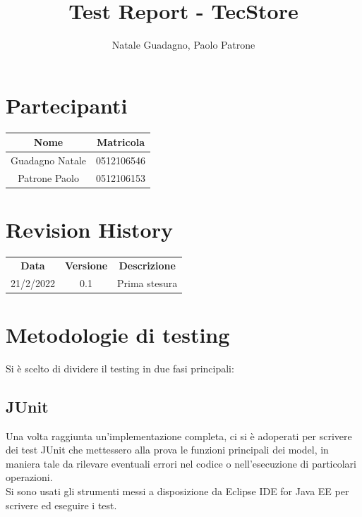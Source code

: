 \documentclass[12pt]{article}
\author{Natale Guadagno, Paolo Patrone}
\title{Test Report - TecStore}
\begin{document}
\maketitle
\newpage
\tableofcontents
\newpage
{}
\section*{Partecipanti}
\begin{center}
\begin{tabular} {|c|c|}
\hline
\textbf{Nome} & \textbf{Matricola} \\
\hline
Guadagno Natale & 0512106546 \\
Patrone Paolo & 0512106153 \\
\hline
\end{tabular}
\end{center}


\section*{Revision History}
\begin{center}
\begin{tabular} {|c|c|c|}
\hline
\textbf{Data} & \textbf{Versione} & \textbf{Descrizione} \\
21/2/2022 & 0.1 & Prima stesura \\
\hline

\hline
\end{tabular}
\end{center}

\newpage

\section{Metodologie di testing}
Si è scelto di dividere il testing in due fasi principali:
\subsection{JUnit}
Una volta raggiunta un'implementazione completa, ci si è adoperati per scrivere dei test JUnit che mettessero alla prova le funzioni principali dei model, in maniera tale da rilevare eventuali errori nel codice o nell'esecuzione di particolari operazioni. \\
Si sono usati gli strumenti messi a disposizione da Eclipse IDE for Java EE per scrivere ed eseguire i test. \\
\end{document}
